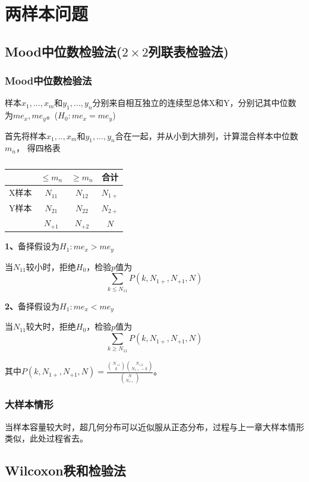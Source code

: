 \documentclass[lang=cn,10pt]{elegantbook}
\begin{document}
\chapter{两样本问题}
\section{Mood中位数检验法($2\times 2$列联表检验法)}
\subsection{Mood中位数检验法}
样本$x_1,...,x_m$和$y_1,...,y_n$分别来自相互独立的连续型总体X和Y，分别记其中位数
为$me_x,me_y$。($H_0:me_x = me_y$)

首先将样本$x_1,..,x_m$和$y_1,...,y_n$合在一起，并从小到大排列，计算混合样本中位数$m_n$，
得四格表
\begin{table}[hp]
    \centering
    \caption{}
    \begin{tabular}{c|c|c|c}
            & $\leq m_n$ & $\geq m_n$ & 合计       \\
        \hline
        X样本 & $N_{11}$   & $N_{12}$   & $N_{1+}$ \\
        \hline
        Y样本 & $N_{21}$   & $N_{22}$   & $N_{2+}$ \\
        \hline
            & $N_{+1}$   & $N_{+2}$   & $N$      \\
    \end{tabular}
\end{table}

\textbf{1、}备择假设为$H_1:me_x> me_y$

当$N_{11}$较小时，拒绝$H_0$，检验$p$值为
$$
    \sum_{k\leq N_{11}}P(k,N_{1+},N_{+1},N)
$$

\textbf{2、}备择假设为$H_1:me_x< me_y$

当$N_{11}$较大时，拒绝$H_0$，检验$p$值为
$$
    \sum_{k\geq N_{11}}P(k,N_{1+},N_{+1},N)
$$

其中$P(k,N_{1+},N_{+1},N) = \frac{{N_{+1} \choose k}{N_{+2} \choose N_{1+} - k}}
    {{N \choose N_{1+}}}$。

\subsection{大样本情形}
当样本容量较大时，超几何分布可以近似服从正态分布，过程与上一章大样本情形类似，此处过程省去。

\section{Wilcoxon秩和检验法}
\end{document}

